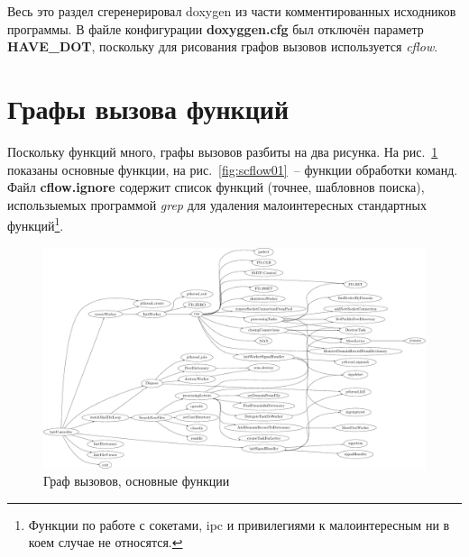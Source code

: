 \documentclass[a4paper,12pt]{report}
\begin{document}
Весь это раздел сгеренерировал doxygen из части комментированных исходников программы. В файле конфигурации \textbf{doxyggen.cfg} был отключён параметр \textbf{HAVE\_DOT}, поскольку для рисования графов вызовов используется \textit{cflow}.

% 

% 
% 
% 
% 
% 
% 
% 
% 
% 
% 


\section{Графы вызова функций}

Поскольку функций много, графы вызовов разбиты на два рисунка. На рис.~\ref{fig:ccflow01} показаны основные функции, на рис.~\ref{fig:scflow01}~-- функции обработки команд. Файл \textbf{cflow.ignore} содержит список функций (точнее, шабловнов поиска), использыемых программой \textit{grep} для удаления малоинтересных стандартных функций\footnote{Функции по работе с сокетами, ipc и привилегиями к малоинтересным ни в коем случае не относятся.}.

\begin{figure}
\centering
\includegraphics[width=\textwidth]{include/ccflow01_dot.pdf}
\caption{Граф вызовов, основные функции}
\label{fig:ccflow01}
\end{figure}
\end{document}
